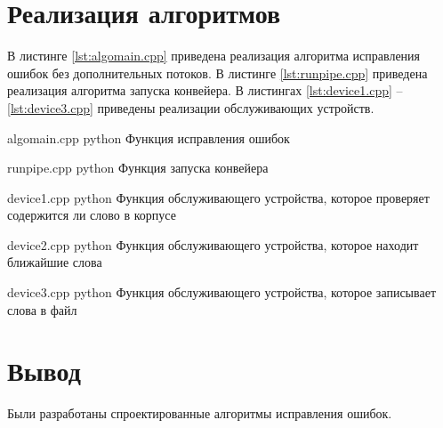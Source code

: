 \section{Реализация алгоритмов}

В листинге \ref{lst:algomain.cpp} приведена реализация алгоритма исправления ошибок без дополнительных потоков. 
В листинге \ref{lst:runpipe.cpp} приведена реализация алгоритма запуска конвейера.
В листингах \ref{lst:device1.cpp} -- \ref{lst:device3.cpp} приведены реализации обслуживающих устройств.

\clearpage
{}
{algomain.cpp} %
{python} %
{Функция исправления ошибок} %

\clearpage

{runpipe.cpp} %
{python} %
{Функция запуска конвейера} %

\clearpage

{device1.cpp} %
{python} %
{Функция обслуживающего устройства, которое проверяет содержится ли слово в корпусе} %

\clearpage

{device2.cpp} %
{python} %
{Функция обслуживающего устройства, которое находит ближайшие слова} %

\clearpage


{device3.cpp} %
{python} %
{Функция обслуживающего устройства, которое записывает слова в файл} %

\clearpage



\section*{Вывод}
Были разработаны спроектированные алгоритмы исправления ошибок.
